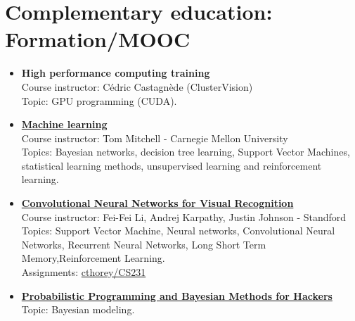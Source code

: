 \documentclass[]{friggeri-cv}
\begin{document}
\section{Complementary education: Formation/MOOC}
\begin{itemize}
\item \textbf{High performance computing training} \\
Course instructor: Cédric Castagnède (ClusterVision)\\
Topic: GPU programming (CUDA).

\item            \href{http://www.cs.cmu.edu/~tom/10701_sp11/}{\textbf{Machine
    learning}}\\
 Course instructor: Tom Mitchell - Carnegie Mellon University\\
    Topics: Bayesian networks,  decision tree learning, Support Vector
    Machines, statistical learning  methods, unsupervised learning and
    reinforcement learning.
\item   \href{http://cs231n.github.io/}{\textbf{Convolutional   Neural
    Networks for Visual Recognition}}\\
Course instructor: Fei-Fei Li, Andrej Karpathy, Justin Johnson - Standford\\
Topics: Support Vector  Machine, Neural networks, Convolutional Neural
Networks,    Recurrent    Neural    Networks,    Long    Short    Term
Memory,Reinforcement Learning.\\
Assignments: \href{https://github.com/cthorey/CS231}{cthorey/CS231}
\item
  \href{http://camdavidsonpilon.github.io/Probabilistic-Programming-and-Bayesian-Methods-for-Hackers/}{\textbf{Probabilistic
    Programming and Bayesian Methods for Hackers}}\\
Topic: Bayesian modeling.
\end{itemize}
\end{document}
